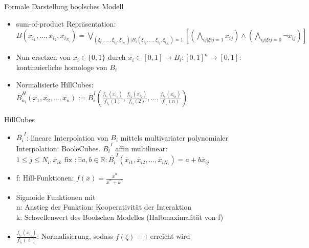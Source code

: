 \documentclass[]{beamer}
\begin{document}
\begin{frame}{Formale Darstellung boolsches Modell}
\begin{itemize}
	\item sum-of-product Repr\"asentation: $B(x_{i_{1}}, ..., x_{i_{2}}, x_{i_{N_{i}}}) = \bigvee_{(\xi_{i_{1}}, ..., \xi_{i_{2}}, \xi_{i_{N_{i}}}) | B_{i}(\xi_{i_{1}}, ..., \xi_{i_{2}}, \xi_{i_{N_{i}}})=1 } [(\bigwedge_{ij | \xi{ij} = 1} x_{ij}) \wedge (\bigwedge_{ij | \xi{ij} = 0} \neg x_{ij})] $
	\pause
	\item Nun ersetzen von $x_{i} \in \{0,1\}$ durch $\overline{x_{i}} \in [0,1] \rightarrow \overline{B_{i}}: [0,1]^{n} \to [0,1]$: kontinuierliche homologe von $B_{i}$
	\pause
	\item Normalisierte HillCubes: $\overline{B}^{H}_{n_{i}}(\overline{x_{1}}, \overline{x_{2}},...,\overline{x_{n}}) := \overline{B}^{I}_{i}(\frac{f_{i_{1}}(\overline{x_{i_{1}}})}{f_{i_{1}}(1)},\frac{f_{i_{2}}(\overline{x_{i_{2}}})}{f_{i_{2}}(2)},...,\frac{f_{i_{n}}(\overline{x_{i_{n}}})}{f_{i_{n}}(n)})$
\end{itemize}
\end{frame}

\begin{frame}{HillCubes}
\begin{itemize}
	\item $\overline{B_{i}}^{I}$: lineare Interpolation von $B_{i}$ mittels multivariater polynomialer Interpolation: BooleCubes. 
	\pause
	$\overline{B_{i}}^{I}$ affin multilinear: $ 1 \leq j \leq N_{i}, \overline{x}_{ik} \text{ fix }: \exists a,b \in \mathbb{R}: \overline{B_{i}}^{I}(\overline{x}_{i1},\overline{x}_{i2},...,\overline{x}_{iN_{i}}) = a + b \overline{x}_{ij}$
	\pause
	\item f: Hill-Funktionen: $f(\overline{x}) = \frac{\overline{x}^{n}}{\overline{x}^{n} + k^{n}}$
	\pause
	\item Sigmoide Funktionen mit
	\\ n: Anstieg der Funktion: Kooperativit\"at der Interaktion
	\\ k: Schwellenwert des Boolschen Modelles (Halbmaximalit\"at von f)
	\pause
	\item $\frac{f_{i_{\ell}}(\overline{x_{i_{\ell}}})}{f_{i_{\ell}}(\ell)}$: Normalisierung, sodass $f(\zeta)=1$ erreicht wird
\end{itemize}
\end{frame}
\end{document}
